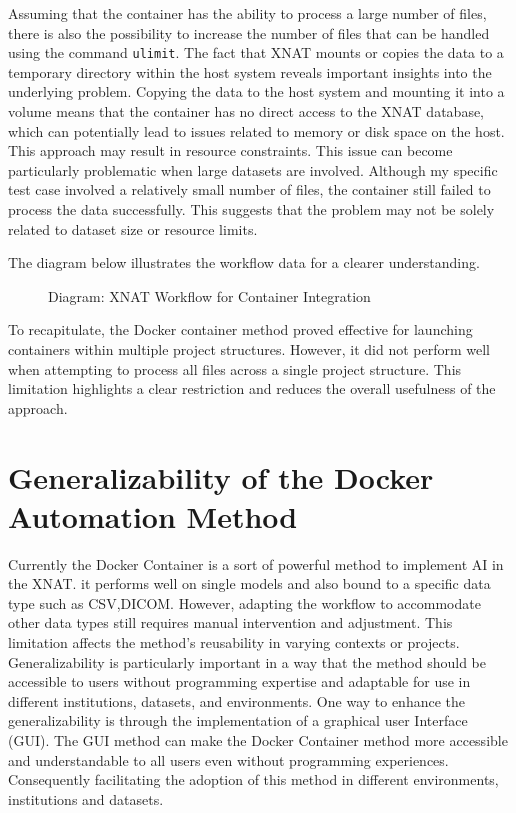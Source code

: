 Assuming that the container has the ability to process a large number of files, there is also the possibility to increase the number of files that can be handled using the command \texttt{ulimit}.  
The fact that XNAT mounts or copies the data to a temporary directory within the host system reveals important insights into the underlying problem. Copying the data to the host system and mounting it into a volume means that the container has no direct access to the XNAT database, which can potentially lead to issues related to memory or disk space on the host. This approach may result in resource constraints.  
This issue can become particularly problematic when large datasets are involved. Although my specific test case involved a relatively small number of files, the container still failed to process the data successfully. This suggests that the problem may not be solely related to dataset size or resource limits.

The diagram below illustrates the workflow data for a clearer understanding.  

\begin{figure}[ht]
    \centering
    \def\svgwidth{\linewidth} 
    
    \caption{Diagram: XNAT Workflow for Container Integration}
    \label{fig:workflowxnat}
\end{figure}


To recapitulate, the Docker container method proved effective for launching containers within multiple project structures. However, it did not perform well when attempting to process all files across a single project structure. This limitation highlights a clear restriction and reduces the overall usefulness of the approach.

\section{Generalizability of the Docker Automation Method}

Currently the Docker Container is a sort of powerful method to implement AI in the XNAT. it performs well on single models and also bound to a specific data type such as CSV,DICOM. However, adapting the workflow to accommodate other data types still requires manual intervention and adjustment. This limitation affects the method’s reusability in varying contexts or projects.
Generalizability is particularly important in a way that the method should be accessible to users without programming expertise and adaptable for use in different institutions, datasets, and environments.
One way to enhance the generalizability is through the implementation of a graphical user Interface (GUI). The GUI method can make the Docker Container method more accessible and understandable to all users even without programming experiences. Consequently facilitating
the adoption of this method in different environments, institutions and datasets.  

